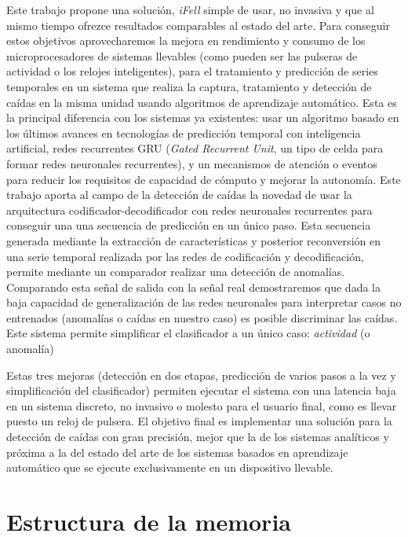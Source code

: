 Este trabajo propone una solución, \textit{iFell} simple de usar, no invasiva y que al mismo tiempo ofrezce resultados comparables al estado del arte. Para conseguir estos objetivos aprovecharemos la mejora en rendimiento y consumo de los microprocesadores de sistemas llevables (como pueden ser las pulseras de actividad o los relojes inteligentes), para el tratamiento y predicción de series temporales en un sistema que realiza la captura, tratamiento y detección de caídas en la misma unidad usando algoritmos de aprendizaje automático. Esta es la principal diferencia con los sistemas ya existentes: usar un algoritmo basado en los últimos avances en tecnologías de predicción temporal con inteligencia artificial, redes recurrentes GRU (\textit{Gated Recurrent Unit}, un tipo de celda para formar redes neuronales recurrentes),  y un mecanismos de atención o eventos para reducir los requisitos de capacidad de cómputo y mejorar la autonomía. Este trabajo aporta al campo de la detección de caídas la novedad de usar la arquitectura codificador-decodificador con redes neuronales recurrentes para conseguir una una secuencia de predicción en un único paso. Esta secuencia generada mediante la extracción de características y posterior reconversión en una serie temporal realizada por las redes de codificación y decodificación, permite mediante un comparador realizar una detección de anomalías. Comparando esta señal de salida con la señal real demostraremos que dada la baja capacidad de generalización de las redes neuronales para interpretar casos no entrenados (anomalías o caídas en nuestro caso) es posible discriminar las caídas. Este sistema permite simplificar el clasificador a un único caso: \textit{actividad} (o anomalía)

Estas tres mejoras (detección en dos etapas, predicción de varios pasos a la vez y simplificación del clasificador) permiten ejecutar el sistema con una latencia baja en un sistema discreto, no invasivo o molesto para el usuario final, como es llevar puesto un reloj de pulsera. El objetivo final es implementar una solución para la detección de caídas con gran precisión, mejor que la de los sistemas analíticos y próxima a la del estado del arte de los sistemas basados en aprendizaje automático que se ejecute exclusivamente en un dispositivo llevable.

\section{Estructura de la memoria}\label{sec:intro:estructura}

